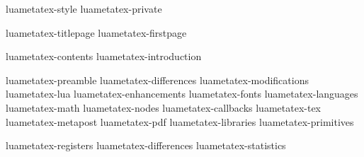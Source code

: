 
%
%






\environment luametatex-style
\environment luametatex-private

\startdocument
  [manual=LuaMeta\TeX,
   version=\cldcontext{status.luatex_verbose}]

\component luametatex-titlepage
\component luametatex-firstpage

\startfrontmatter
    \component luametatex-contents
    \component luametatex-introduction
\stopfrontmatter

\startbodymatter
    \component luametatex-preamble
    \component luametatex-differences
    \component luametatex-modifications
    \component luametatex-lua
    \component luametatex-enhancements
    \component luametatex-fonts
    \component luametatex-languages
    \component luametatex-math
    \component luametatex-nodes
    \component luametatex-callbacks
    \component luametatex-tex
    \component luametatex-metapost
    \component luametatex-pdf
    \component luametatex-libraries
    \component luametatex-primitives
\stopbodymatter

\startbackmatter
    \component luametatex-registers
    \component luametatex-differences
    \component luametatex-statistics
\stopbackmatter

\stopdocument

